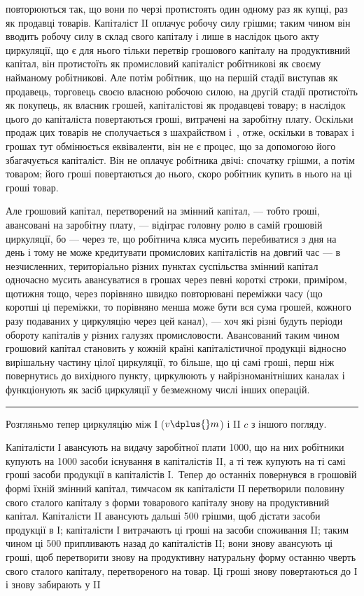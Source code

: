 \parcont{}  %
повторюються так, що вони по черзі протистоять один одному раз як
купці, раз як продавці товарів. Капіталіст II оплачує робочу силу грішми;
таким чином він вводить робочу силу в склад свого капіталу і лише
в наслідок цього акту циркуляції, що є для нього тільки перетвір грошового
капіталу на продуктивний капітал, він протистоїть як промисловий
капіталіст робітникові як своєму найманому робітникові. Але
потім робітник, що на першій стадії виступав як продавець, торговець
своєю власною робочою силою, на другій стадії протистоїть як покупець,
як власник грошей, капіталістові як продавцеві товару; в наслідок цього
до капіталіста повертаються гроші, витрачені на заробітну плату. Оскільки
продаж цих товарів не сполучається з шахрайством і~, отже,
оскільки в товарах і грошах тут обмінюється еквіваленти, він не є процес,
що за допомогою його збагачується капіталіст. Він не оплачує
робітника двічі: спочатку грішми, а потім товаром; його гроші повертаються
до нього, скоро робітник купить в нього на ці гроші товар.

Але грошовий капітал, перетворений на змінний капітал, — тобто гроші,
авансовані на заробітну плату, — відіграє головну ролю в самій грошовій
циркуляції, бо — через те, що робітнича кляса мусить перебиватися з
дня на день і тому не може кредитувати промислових капіталістів на
довгий час — в незчисленних, територіально різних пунктах суспільства
змінний капітал одночасно мусить авансуватися в грошах через певні
короткі строки, приміром, щотижня тощо, через порівняно швидко
повторювані переміжки часу (що коротші ці переміжки, то порівняно
менша може бути вся сума грошей, кожного разу подаваних у
циркуляцію через цей канал), — хоч які різні будуть періоди обороту
капіталів у різних галузях промисловости. Авансований таким чином грошовий
капітал становить у кожній країні капіталістичної продукціі відносно
вирішальну частину цілої циркуляції, то більше, що ці самі гроші,
перш ніж повернутись до вихідного пункту, циркулюють у найрізноманітніших
каналах і функціонують як засіб циркуляції у безмежному числі
інших операцій.
\pfbreak
Розгляньмо тепер циркуляцію між І ($v \dplus{} m$) і II $c$ з іншого погляду.

Капіталісти І авансують на видачу заробітної плати 1000,
що на них робітники купують на 1000 засоби існування в капіталістів
II, а ті теж купують на ті самі гроші засоби продукції в капіталістів
І.~Тепер до останніх повернувся в грошовій формі їхній змінний
капітал, тимчасом як капіталісти II перетворили половину свого сталого
капіталу з форми товарового капіталу знову на продуктивний капітал.
Капіталісти II авансують дальші 500 грішми, щоб дістати засоби
продукції в І; капіталісти І витрачають ці гроші на засоби споживання
II; таким чином ці 500 припливають назад до капіталістів II;
вони знову авансують ці гроші, щоб перетворити знову на продуктивну
натуральну форму останню чверть свого сталого капіталу, перетвореного
на товар. Ці гроші знову повертаються до І і знову забирають у II
\parbreak{}  %
